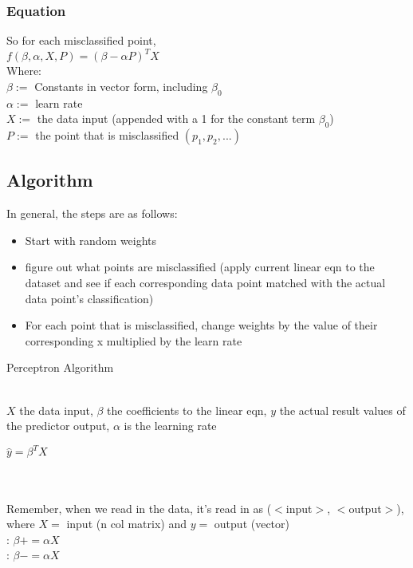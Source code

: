 \documentclass{article}
\begin{document}
\subsubsection{Equation}
So for each misclassified point,\\
$f(\beta, \alpha, X, P) = (\beta - \alpha P)^TX$\\
Where:\\
$\beta :=$ Constants in vector form, including $\beta_0$\\
$\alpha :=$ learn rate\\
$X :=$ the data input (appended with a 1 for the constant term $\beta_0$)\\
$P :=$ the point that is misclassified $(p_1, p_2, ...)$\\

\subsection{Algorithm}
In general, the steps are as follows:

\begin{itemize}
	\item Start with random weights
	\item figure out what points are misclassified (apply current linear eqn to the dataset and see if each corresponding data point matched with the actual data point's classification)
	\item For each point that is misclassified, change weights by the value of their corresponding x multiplied by the learn rate
\end{itemize}

\begin{algorithm}
	\caption{Perceptron Algorithm}
	\begin{algorithmic}
		\\
		\Comment $X$ the data input, $\beta$ the coefficients to the linear eqn, $y$ the actual result values of the predictor output, $\alpha$ is the learning rate
		
		\State $\hat{y} = \beta^TX$
		
		\\\\
		\Comment Remember, when we read in the data, it's read in as ($<$input$>$, $<$output$>$), where $X = $ input (n col matrix) and $y = $ output (vector)\\
		
		:
			\State $\beta += \alpha X$
		\EndIf\\
		
		:
			\State $\beta -= \alpha X$
		\EndIf\\
		
		\EndFor
		
		
		
		\EndProcedure
	\end{algorithmic}
\end{algorithm}
\end{document}
